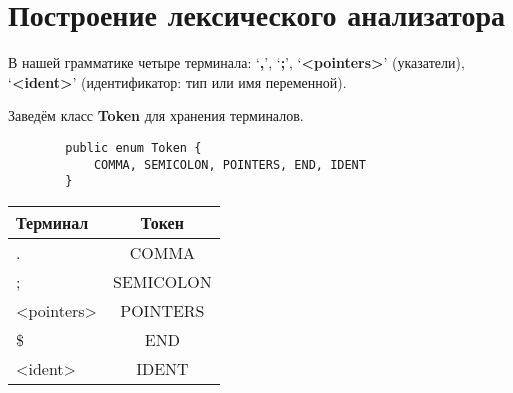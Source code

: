 \section{Построение лексического анализатора}

В нашей грамматике четыре терминала:
    ‘\textbf{,}’,
    ‘\textbf{;}’,
    ‘\textbf{<pointers>}’ (указатели),
    ‘\textbf{<ident>}’ (идентификатор: тип или имя переменной).

Заведём класс \textbf{Token} для хранения терминалов.

\begin{center}
    \begin{lstlisting}
        public enum Token {
            COMMA, SEMICOLON, POINTERS, END, IDENT
        }
    \end{lstlisting}

    \begin{tabular}{| l | c |}
        \hline
        \textbf{Терминал} & \textbf{Токен} \\
        \hline
        . & COMMA \\
        \hline
        ; & SEMICOLON \\
        \hline
        <pointers> & POINTERS \\
        \hline
        \$ & END \\
        \hline
        <ident> & IDENT \\
        \hline
    \end{tabular}
\end{center}
